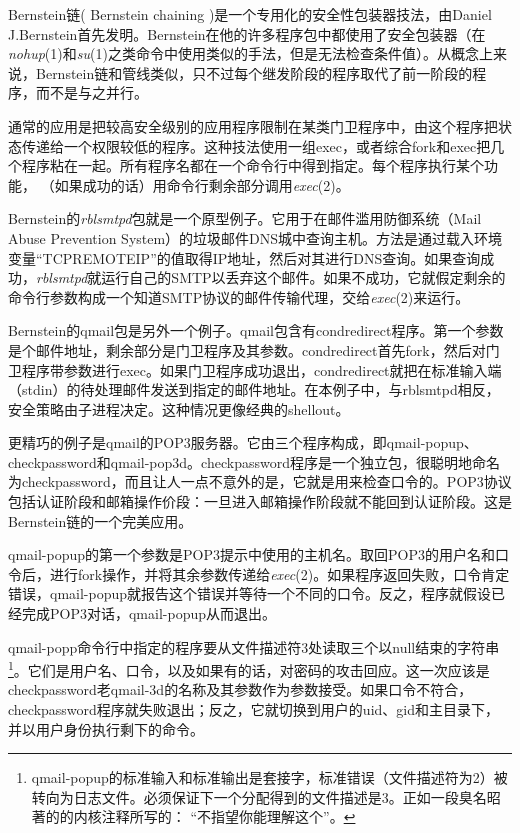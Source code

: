 \documentclass[12pt,oneside]{book}
\begin{document}
\begin{common-format}
Bernstein链( Bernstein  chaining )是一个专用化的安全性包装器技法，由Daniel J.Bernstein首先发明。Bernstein在他的许多程序包中都使用了安全包装器（在\textit{nohup}(1)和\textit{su}(1)之类命令中使用类似的手法，但是无法检查条件值）。从概念上来说，Bernstein链和管线类似，只不过每个继发阶段的程序取代了前一阶段的程序，而不是与之并行。

通常的应用是把较高安全级别的应用程序限制在某类门卫程序中，由这个程序把状态传递给一个权限较低的程序。这种技法使用一组exec，或者综合fork和exec把几个程序粘在一起。所有程序名都在一个命令行中得到指定。每个程序执行某个功能，  （如果成功的话）用命令行剩余部分调用\textit{exec}(2)。

Bernstein的\textit{rblsmtpd}包就是一个原型例子。它用于在邮件滥用防御系统（Mail Abuse Prevention System）的垃圾邮件DNS城中查询主机。方法是通过载入环境变量“TCPREMOTEIP”的值取得IP地址，然后对其进行DNS查询。如果查询成功，\textit{rblsmtpd}就运行自己的SMTP以丢弃这个邮件。如果不成功，它就假定剩余的命令行参数构成一个知道SMTP协议的邮件传输代理，交给\textit{exec}(2)来运行。

Bernstein的qmail包是另外一个例子。qmail包含有condredirect程序。第一个参数是个邮件地址，剩余部分是门卫程序及其参数。condredirect首先fork，然后对门卫程序带参数进行exec。如果门卫程序成功退出，condredirect就把在标准输入端（stdin）的待处理邮件发送到指定的邮件地址。在本例子中，与rblsmtpd相反，安全策略由子进程决定。这种情况更像经典的shellout。

更精巧的例子是qmail的POP3服务器。它由三个程序构成，即qmail-popup、checkpassword和qmail-pop3d。checkpassword程序是一个独立包，很聪明地命名为checkpassword，而且让人一点不意外的是，它就是用来检查口令的。POP3协议包括认证阶段和邮箱操作价段：一旦进入邮箱操作阶段就不能回到认证阶段。这是Bernstein链的一个完美应用。

qmail-popup的第一个参数是POP3提示中使用的主机名。取回POP3的用户名和口令后，进行fork操作，并将其余参数传递给\textit{exec}(2)。如果程序返回失败，口令肯定错误，qmail-popup就报告这个错误并等待一个不同的口令。反之，程序就假设已经完成POP3对话，qmail-popup从而退出。

qmail-popp命令行中指定的程序要从文件描述符3处读取三个以null结束的字符串\footnote{qmail-popup的标准输入和标准输出是套接字，标准错误（文件描述符为2）被转向为日志文件。必须保证下一个分配得到的文件描述是3。正如一段臭名昭著的的内核注释所写的：  “不指望你能理解这个”。}。它们是用户名、口令，以及如果有的话，对密码的攻击回应。这一次应该是checkpassword老qmail-3d的名称及其参数作为参数接受。如果口令不符合，checkpassword程序就失败退出；反之，它就切换到用户的uid、gid和主目录下，并以用户身份执行剩下的命令。


\end{common-format}
\end{document}
